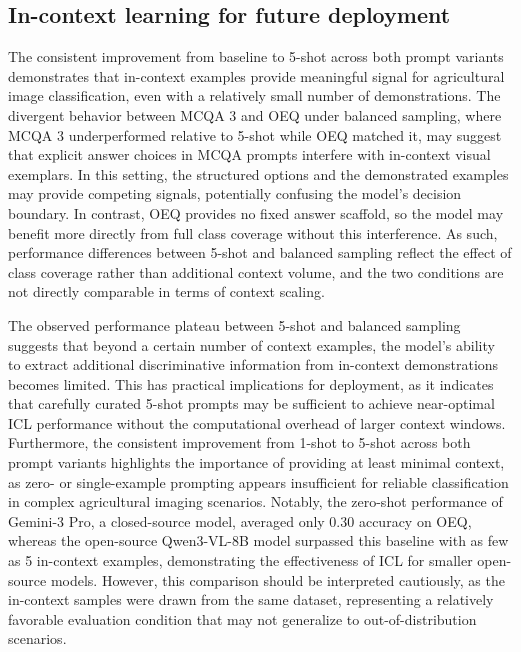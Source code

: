 \documentclass[10pt,letterpaper]{article}
\begin{document}
\subsection{In-context learning for future deployment}
The consistent improvement from baseline to 5-shot across both prompt variants demonstrates that in-context examples provide meaningful signal for agricultural image classification, even with a relatively small number of demonstrations. The divergent behavior between MCQA 3 and OEQ under balanced sampling, where MCQA 3 underperformed relative to 5-shot while OEQ matched it, may suggest that explicit answer choices in MCQA prompts interfere with in-context visual exemplars. In this setting, the structured options and the demonstrated examples may provide competing signals, potentially confusing the model's decision boundary. In contrast, OEQ provides no fixed answer scaffold, so the model may benefit more directly from full class coverage without this interference. As such, performance differences between 5-shot and balanced sampling reflect the effect of class coverage rather than additional context volume, and the two conditions are not directly comparable in terms of context scaling.

The observed performance plateau between 5-shot and balanced sampling suggests that beyond a certain number of context examples, the model's ability to extract additional discriminative information from in-context demonstrations becomes limited. This has practical implications for deployment, as it indicates that carefully curated 5-shot prompts may be sufficient to achieve near-optimal ICL performance without the computational overhead of larger context windows. Furthermore, the consistent improvement from 1-shot to 5-shot across both prompt variants highlights the importance of providing at least minimal context, as zero- or single-example prompting appears insufficient for reliable classification in complex agricultural imaging scenarios. Notably, the zero-shot performance of Gemini-3 Pro, a closed-source model, averaged only 0.30 accuracy on OEQ, whereas the open-source Qwen3-VL-8B model surpassed this baseline with as few as 5 in-context examples, demonstrating the effectiveness of ICL for smaller open-source models. However, this comparison should be interpreted cautiously, as the in-context samples were drawn from the same dataset, representing a relatively favorable evaluation condition that may not generalize to out-of-distribution scenarios.
\end{document}
